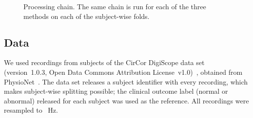 \begin{figure}[t]
\centering
{}
\caption{Processing chain. The same chain is run for each of the three methods on each of the
 subject-wise folds.}
\label{fig:pipeline}
\end{figure}

\subsection{Data}
\label{sec:data}
We used  recordings from  subjects of the CirCor DigiScope
data set (version~1.0.3, Open Data Commons Attribution License~v1.0)~\cite{Oliveira2022,Oliveira2022data},
obtained from PhysioNet~\cite{Pollard2026}. The data set releases a subject identifier with
every recording, which makes subject-wise splitting possible; the clinical outcome label
(normal or abnormal) released for each subject was used as the reference. All recordings were
resampled to ~Hz.


